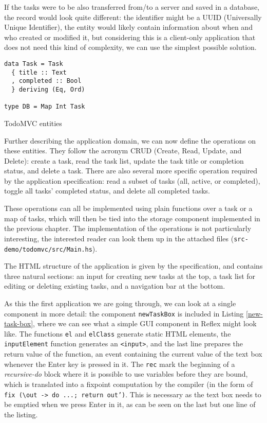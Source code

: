 \documentclass[english,odsaz]{fitthesis}
\begin{document}
If the tasks were to be also transferred from/to a server and saved in a
database, the record would look quite different: the identifier might be a UUID
(Universally Unique Identifier), the entity would likely contain information
about when and who created or modified it, but considering this is a client-only
application that does not need this kind of complexity, we can use the simplest
possible solution.

\begin{listing}[htbp]
\begin{verbatim}
data Task = Task
  { title :: Text
  , completed :: Bool
  } deriving (Eq, Ord)

type DB = Map Int Task
\end{verbatim}
\caption{TodoMVC entities \label{todomvc-entities}}
\end{listing}

Further describing the application domain, we can now define the operations on
these entities. They follow the acronym CRUD (Create, Read, Update, and Delete):
create a task, read the task list, update the task title or completion status,
and delete a task. There are also several more specific operation required by
the application specification: read a subset of tasks (all, active, or
completed), toggle all tasks' completed status, and delete all completed tasks.

These operations can all be implemented using plain functions over a task or a
map of tasks, which will then be tied into the storage component implemented in
the previous chapter. The implementation of the operations is not particularly
interesting, the interested reader can look them up in the attached files
(\texttt{src-demo/todomvc/src/Main.hs}).

The HTML structure of the application is given by the specification, and
contains three natural sections: an input for creating new tasks at the top, a
task list for editing or deleting existing tasks, and a navigation bar at the
bottom.

As this the first application we are going through, we can look at a single
component in more detail: the component \texttt{newTaskBox} is included in Listing
\ref{new-task-box}, where we can see what a simple GUI component in Reflex might
look like. The functions \texttt{el} and \texttt{elClass} generate static HTML elements, the
\texttt{inputElement} function generates an \texttt{<input>}, and the last line prepares the
return value of the function, an event containing the current value of the text
box whenever the Enter key is pressed in it. The \texttt{rec} mark the beginning of a
\emph{recursive-do} block where it is possible to use variables before they are bound,
which is translated into a fixpoint computation by the compiler (in the form of
\texttt{fix (\textbackslash{}out -> do ...; return out')}. This is necessary as the text box needs to be
emptied when we press Enter in it, as can be seen on the last but one line of
the listing.
\end{document}
